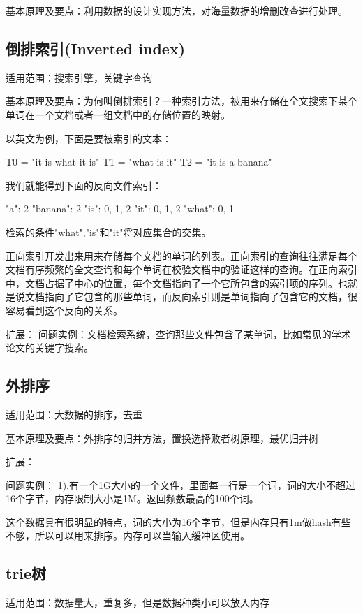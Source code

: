 基本原理及要点：利用数据的设计实现方法，对海量数据的增删改查进行处理。

\subsection{倒排索引(Inverted index)}
适用范围：搜索引擎，关键字查询

基本原理及要点：为何叫倒排索引？一种索引方法，被用来存储在全文搜索下某个单词在一个文档或者一组文档中的存储位置的映射。

以英文为例，下面是要被索引的文本：
\begin{Code}
	T0 = "it is what it is"
	T1 = "what is it"
	T2 = "it is a banana"
\end{Code}


我们就能得到下面的反向文件索引：
\begin{Code}
	"a":      {2}
	"banana": {2}
	"is":     {0, 1, 2}
	"it":     {0, 1, 2}
	"what":   {0, 1}
\end{Code}


检索的条件"what","is"和"it"将对应集合的交集。

正向索引开发出来用来存储每个文档的单词的列表。正向索引的查询往往满足每个文档有序频繁的全文查询和每个单词在校验文档中的验证这样的查询。在正向索引中，文档占据了中心的位置，每个文档指向了一个它所包含的索引项的序列。也就是说文档指向了它包含的那些单词，而反向索引则是单词指向了包含它的文档，很容易看到这个反向的关系。

扩展：
问题实例：文档检索系统，查询那些文件包含了某单词，比如常见的学术论文的关键字搜索。

\subsection{外排序}
适用范围：大数据的排序，去重

基本原理及要点：外排序的归并方法，置换选择败者树原理，最优归并树

扩展：

问题实例：
1).有一个1G大小的一个文件，里面每一行是一个词，词的大小不超过16个字节，内存限制大小是1M。返回频数最高的100个词。

这个数据具有很明显的特点，词的大小为16个字节，但是内存只有1m做hash有些不够，所以可以用来排序。内存可以当输入缓冲区使用。

\subsection{trie树}
适用范围：数据量大，重复多，但是数据种类小可以放入内存

